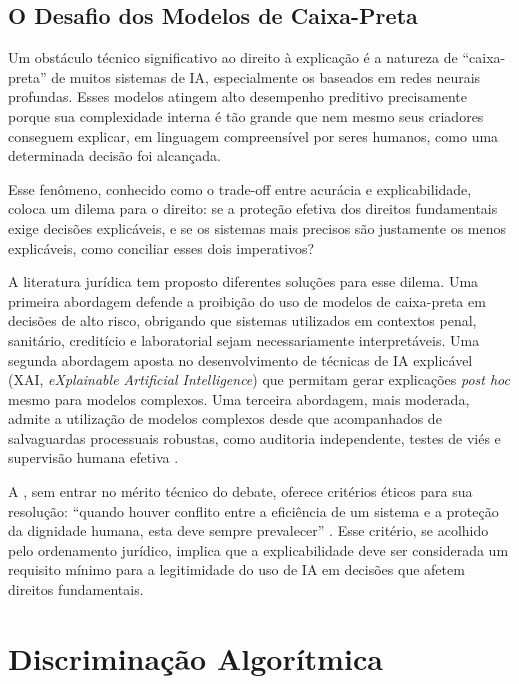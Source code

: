 \subsection{O Desafio dos Modelos de Caixa-Preta}
\label{subsec:caixa-preta}

Um obstáculo técnico significativo ao direito à explicação é a natureza de ``caixa-preta'' de muitos sistemas de IA, especialmente os baseados em redes neurais profundas. Esses modelos atingem alto desempenho preditivo precisamente porque sua complexidade interna é tão grande que nem mesmo seus criadores conseguem explicar, em linguagem compreensível por seres humanos, como uma determinada decisão foi alcançada.

Esse fenômeno, conhecido como o trade-off entre acurácia e explicabilidade, coloca um dilema para o direito: se a proteção efetiva dos direitos fundamentais exige decisões explicáveis, e se os sistemas mais precisos são justamente os menos explicáveis, como conciliar esses dois imperativos?

A literatura jurídica tem proposto diferentes soluções para esse dilema. Uma primeira abordagem defende a proibição do uso de modelos de caixa-preta em decisões de alto risco, obrigando que sistemas utilizados em contextos penal, sanitário, creditício e laboratorial sejam necessariamente interpretáveis. Uma segunda abordagem aposta no desenvolvimento de técnicas de IA explicável (XAI, \textit{eXplainable Artificial Intelligence}) que permitam gerar explicações \textit{post hoc} mesmo para modelos complexos. Uma terceira abordagem, mais moderada, admite a utilização de modelos complexos desde que acompanhados de salvaguardas processuais robustas, como auditoria independente, testes de viés e supervisão humana efetiva \cite{Goodman2017EU, Selbst2018TIR, DoshiVelez2017MAR}.

A \MH{}, sem entrar no mérito técnico do debate, oferece critérios éticos para sua resolução: ``quando houver conflito entre a eficiência de um sistema e a proteção da dignidade humana, esta deve sempre prevalecer'' \cite{LeaoXIV2026MH}. Esse critério, se acolhido pelo ordenamento jurídico, implica que a explicabilidade deve ser considerada um requisito mínimo para a legitimidade do uso de IA em decisões que afetem direitos fundamentais.

\section{Discriminação Algorítmica}
\label{sec:discriminacao}

